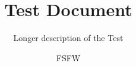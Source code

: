 \documentclass{scrartcl}
\subtitle{Longer description of the Test}
\title{Test Document}
\author{FSFW}
\begin{document}
\begin{fsfwtitle}
\end{fsfwtitle}
\Blindtext
\end{document}
